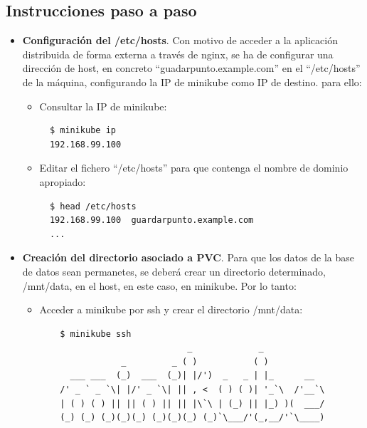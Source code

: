 \documentclass[12pt,spanish]{article}
\begin{document}
\subsection{Instrucciones paso a paso}
\begin{itemize}
\item{\textbf{Configuración del /etc/hosts}}. Con motivo de acceder a la aplicación distribuida de forma externa a través de nginx, se ha de configurar una dirección de host, en concreto ``guadarpunto.example.com'' en el ``/etc/hosts'' de la máquina, configurando la IP de minikube como IP de destino. para ello:
  \begin{itemize}
  \item{Consultar la IP de minikube}:
  \begin{verbatim}
  $ minikube ip
  192.168.99.100
  \end{verbatim}
  \item{Editar el fichero ``/etc/hosts'' para que contenga el nombre de dominio apropiado}:
  \begin{verbatim}
  $ head /etc/hosts
  192.168.99.100  guardarpunto.example.com
  ...
  \end{verbatim}
  \end{itemize}
\item{\textbf{Creación del directorio asociado a PVC}}. Para que los datos de la base de datos sean permanetes, se deberá crear un directorio determinado, /mnt/data, en el host, en este caso, en minikube. Por lo tanto:
  \begin{itemize}
  \item{Acceder a minikube por ssh y crear el directorio /mnt/data}:
  \begin{verbatim}
    $ minikube ssh
                             _             _
                _         _ ( )           ( )
      ___ ___  (_)  ___  (_)| |/')  _   _ | |_      __
    /' _ ` _ `\| |/' _ `\| || , <  ( ) ( )| '_`\  /'__`\
    | ( ) ( ) || || ( ) || || |\`\ | (_) || |_) )(  ___/
    (_) (_) (_)(_)(_) (_)(_)(_) (_)`\___/'(_,__/'`\____)


\end{verbatim}
\end{itemize}
\end{itemize}
\end{document}
